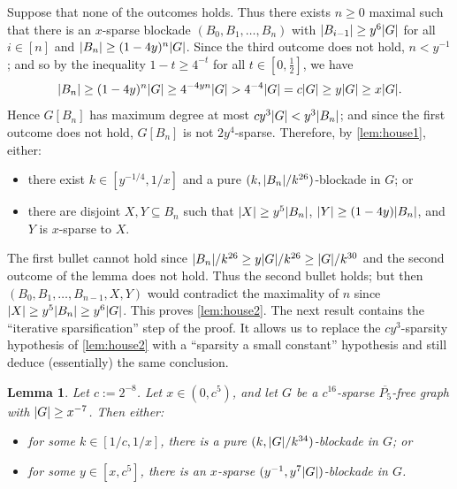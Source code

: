 \documentclass[11pt,reqno,a4paper]{amsart}
\newtheorem{lemma}[theorem]{Lemma}
\let\oldendproof\endproof
\renewenvironment{proof}[1][\proofname]{%
	\oldproof[\normalfont\bfseries #1]%
}{\oldendproof}
\renewcommand{\subset}{\subseteq}
\DeclarePairedDelimiter\abs{\lvert}{\rvert}%
\begin{document}
	\begin{proof}
		Suppose that none of the outcomes holds.
		Thus there exists $n\ge0$ maximal such that there is an $x$-sparse blockade $(B_0,B_1,\ldots,B_n)$ with $\abs{B_{i-1}}\ge{y^6\abs G}$ for all $i\in[n]$ and $\abs{B_n}\ge(1-4y)^n\abs G$.
		Since the third outcome does not hold, $n<y^{-1}$; and so by the inequality $1-t\ge4^{-t}$ for all $t\in[0,\frac12]$, we have
		\[\abs{B_n}\ge (1-4y)^n\abs G
		\ge 4^{-4yn}\abs G>4^{-4}\abs G=c\abs G
		\ge y\abs G\ge x\abs G.\]
		Hence $G[B_n]$ has maximum degree at most $cy^3\abs G<y^3\abs{B_n}$; and since the first outcome does not hold,
		$G[B_n]$ is not $2y^4$-sparse.
		Therefore, by \cref{lem:house1}, either:
		\begin{itemize}
			\item there exist $k\in[y^{-1/4},1/x]$ and a pure $(k,\abs{B_n}/k^{26})$-blockade in $G$; or
			
			\item there are disjoint $X,Y\subset B_n$ such that $\abs X\ge{y^5\abs{B_n}}$, $\abs Y\ge(1-4y)\abs{B_n}$, and $Y$ is $x$-sparse to $X$.
		\end{itemize}
		
		The first bullet cannot hold since $\abs{B_n}/k^{26}\ge y\abs G/k^{26}\ge \abs G/k^{30}$ and the second outcome of the lemma does not hold.
		Thus the second bullet holds; but then $(B_0,B_1,\ldots,B_{n-1},X,Y)$ would contradict the maximality of $n$ since $\abs X\ge{y^5\abs{B_n}}\ge{y^6\abs G}$.
		This proves \cref{lem:house2}.
	\end{proof}
	The next result contains the ``iterative sparsification'' step of the proof. It allows us to replace
	the $cy^3$-sparsity hypothesis of \cref{lem:house2} with a ``sparsity a small constant'' hypothesis and still
	deduce (essentially) the same conclusion.
	\begin{lemma}
		\label{lem:house3}
		Let $c:=2^{-8}$. Let $x\in(0,c^5)$, and let $G$ be a $c^{16}$-sparse $\overline{P_5}$-free graph with $\abs G\ge x^{-7}$.
		Then either:
		\begin{itemize}
			\item for some $k\in[1/c,1/x]$, there is a pure $(k,\abs G/k^{34})$-blockade in $G$; or
			
			\item for some $y\in[x,c^5]$, there is an $x$-sparse $(y^{-1},{y^7\abs G})$-blockade in $G$.
		\end{itemize}
	\end{lemma}
\end{document}
